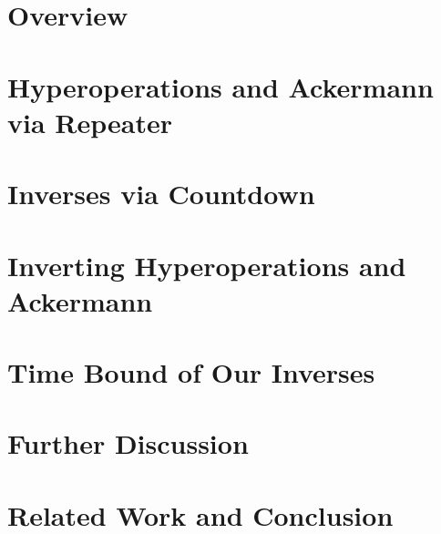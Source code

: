 \documentclass[runningheads]{llncs}
\begin{document}


\section{Overview}
\label{sec: overview}


\section{Hyperoperations and Ackermann via Repeater}
\label{sec: countdown-repeater}


\section{Inverses via Countdown}
\label{sec: countdown}


\section{Inverting Hyperoperations and Ackermann}
\label{sec: inv-hyperop}


\section{Time Bound of Our Inverses}
\label{sec: inv-ack}


\section{Further Discussion}
\label{sec: discussion}


\section{Related Work and Conclusion}








\appendix






\end{document}
